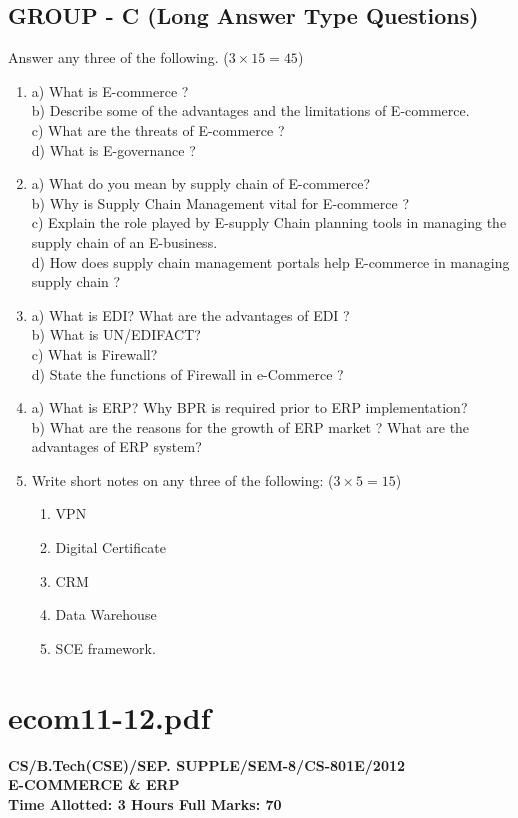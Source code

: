 \documentclass{article}
\begin{document}
\subsection*{GROUP - C (Long Answer Type Questions)}
Answer any three of the following. ($3 \times 15 = 45$)
\begin{enumerate}
    \item[7.] 
    a) What is E-commerce ? \\
    b) Describe some of the advantages and the limitations of E-commerce. \\
    c) What are the threats of E-commerce ? \\
    d) What is E-governance ?
    \item[8.] 
    a) What do you mean by supply chain of E-commerce? \\
    b) Why is Supply Chain Management vital for E-commerce ? \\
    c) Explain the role played by E-supply Chain planning tools in managing the supply chain of an E-business. \\
    d) How does supply chain management portals help E-commerce in managing supply chain ?
    \item[9.] 
    a) What is EDI? What are the advantages of EDI ? \\
    b) What is UN/EDIFACT? \\
    c) What is Firewall? \\
    d) State the functions of Firewall in e-Commerce ?
    \item[10.] 
    a) What is ERP? Why BPR is required prior to ERP implementation? \\
    b) What are the reasons for the growth of ERP market ? What are the advantages of ERP system?
    \item[11.] Write short notes on any three of the following: ($3 \times 5 = 15$)
    \begin{enumerate}
        \item[a)] VPN
        \item[b)] Digital Certificate
        \item[c)] CRM
        \item[d)] Data Warehouse
        \item[e)] SCE framework.
    \end{enumerate}
\end{enumerate}

\newpage
\section*{ecom11-12.pdf}
\textbf{CS/B.Tech(CSE)/SEP. SUPPLE/SEM-8/CS-801E/2012} \\
\textbf{E-COMMERCE \& ERP} \\
\textbf{Time Allotted: 3 Hours \hfill Full Marks: 70}
\end{document}
